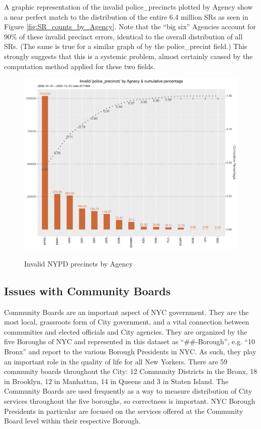 \documentclass[12pt, titlepage]{article}
\begin{document}
{	A graphic representation of the invalid police\_precincts plotted by Agency show a near perfect match to the
	distribution of the entire 6.4 million SRs as seen in Figure \ref{fig:SR_counts_by_Agency}. Note that the ``big six'' Agencies account for 90\% of these invalid precinct errors, identical
	to the overall distribution of all SRs. (The same is true for a similar graph of by the police\_precint field.) This strongly suggests that this is a systemic problem, almost certainly caused by the computation method applied for these two fields.
	 
	\begin{figure}[tbp]
	  \centering
	  \caption{Invalid NYPD precincts by Agency}
		  \includegraphics[width=\textwidth]{invalid_police_precincts.pdf}	  
		  \label{fig:invalid_police_precincts_zip}
	\end{figure}

	\subsection{Issues with Community Boards}
	Community Boards are an important aspect of NYC government. They are the most local, grassroots form of City government, 
	and a vital connection between communities and elected officials and City agencies. They are organized by the five Boroughs of NYC and represented
	in this dataset as ``\#\#-Borough'', e.g. ``10 Bronx'' and report to the various Borough Presidents in NYC. As such, they play an important role in the quality of life for all New Yorkers.
	There are 59 community boards throughout the City: 12 Community Districts in the Bronx, 18 in Brooklyn, 12 in Manhattan, 14 in Queens and 3 in Staten Island.
	The Community Boards are used frequently as a way to measure distribution of City services throughout the five boroughs, so correctness is important. 
	NYC Borough Presidents in particular are focused on the services offered at the Community Board level within their respective Borough.
	
}
\end{document}
